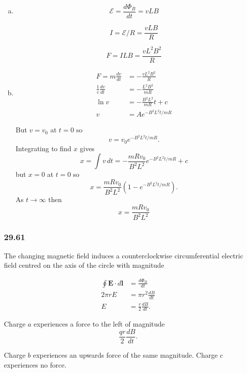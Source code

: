 \documentclass{article}
\begin{document}
\begin{enumerate}[(a)]
  \item

        \[\mathcal{E} = \frac{d \Phi_B}{dt} = v L B\]

        \[I = \mathcal{E} / R = \frac{v L B}{R}\]

        \[F = I L B = \frac{v L^2 B^2}{R}\]

  \item

        \begin{align*}
          F = m \frac{dv}{dt}       & = -\frac{v L^2 B^2}{R}      \\
          \frac{1}{v} \frac{dv}{dt} & = -\frac{L^2 B^2}{m R}      \\
          \ln v                     & = -\frac{B^2 L^2}{mR} t + c \\
          v                         & = A e^{-B^2 L^2 t / m R}
        \end{align*}

        But $v = v_0$ at $t = 0$ so \[v = v_0 e^{-B^2 L^2 t / m R}.\] Integrating to find $x$ gives \[x = \int v \,dt = -\frac{m R v_0}{B^2 L^2} e^{-B^2 L^2 t / m R} + c\] but $x = 0$ at $t = 0$ so \[x = \frac{m R v_0}{B^2 L^2} \left( 1 - e^{-B^2 L^2 t / m R} \right).\] As $t \rightarrow \infty$ then \[x = \frac{m R v_0}{B^2 L^2}\]
\end{enumerate}

\subsubsection{29.61}

The changing magnetic field induces a counterclockwise circumferential electric field centred on the axis of the circle with magnitude

\begin{align*}
  \oint \mathbf{E} \cdot d \mathbf{l} & = \frac{d \Phi_B}{dt}        \\
  2 \pi r E                           & = \pi r^2 \frac{dB}{dt}      \\
  E                                   & = \frac{r}{2} \frac{dB}{dt}.
\end{align*}

Charge $a$ experiences a force to the left of magnitude \[\frac{q r}{2} \frac{dB}{dt}.\]

Charge $b$ experiences an upwards force of the same magnitude. Charge $c$ experiences no force.
\end{document}
